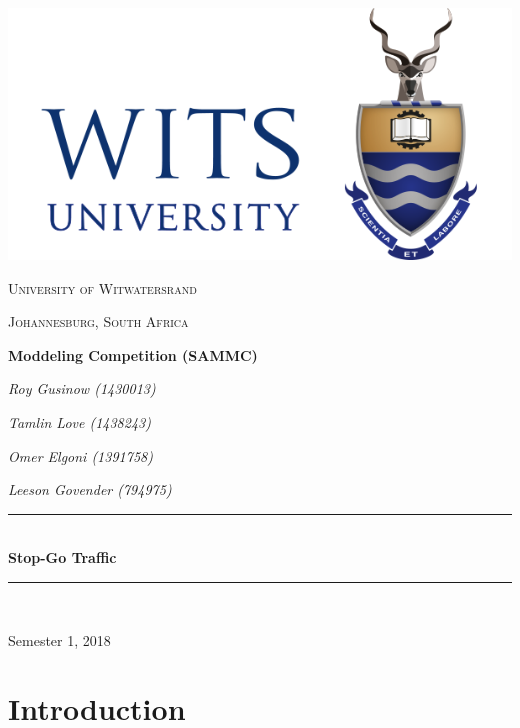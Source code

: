 \documentclass[a4paper]{article}
\begin{document}
\begin{titlepage}
	\centering
	
\includegraphics[scale=0.6]{Wits-logo-colour-left-600x300}
	\vspace{1cm}
	
\newcommand{\HRule}{\rule{\linewidth}{0.5mm}} %

{\scshape\Large University of Witwatersrand\par}
{\scshape\Large Johannesburg, South Africa\par}
	\vspace{1.0cm}
	{\huge\bfseries Moddeling Competition (SAMMC) \par}
	\vspace{1cm}
	{\Large\itshape Roy Gusinow (1430013)\par}
	\vspace{0.5cm}
	{\Large\itshape Tamlin Love (1438243)\par}
	\vspace{0.5cm}
	{\Large\itshape Omer Elgoni (1391758)\par}
	\vspace{0.5cm}
	{\Large\itshape Leeson Govender (794975)\par}
	\vspace{0.5cm}
	\vfill
	
\HRule \\[0.4cm]
{ \huge \bfseries Stop-Go Traffic}\\[0.4cm] %
\HRule \\[1.0cm]
	{\large Semester 1, 2018\par}

\end{titlepage}

\section{Introduction}
\end{document}
